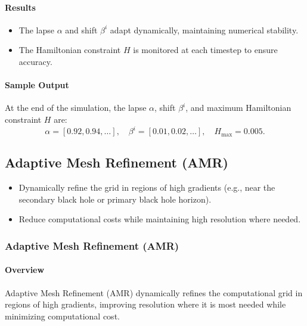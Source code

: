\documentclass[12pt]{article}
\begin{document}
\paragraph{Results}
\begin{itemize}
    \item The lapse $\alpha$ and shift $\beta^i$ adapt dynamically, maintaining numerical stability.
    \item The Hamiltonian constraint $H$ is monitored at each timestep to ensure accuracy.
\end{itemize}

\paragraph{Sample Output}
At the end of the simulation, the lapse $\alpha$, shift $\beta^i$, and maximum Hamiltonian constraint $H$ are:
\[
\alpha = [0.92, 0.94, \dots], \quad \beta^i = [0.01, 0.02, \dots], \quad H_{\text{max}} = 0.005.
\]


\subsection{Adaptive Mesh Refinement (AMR)}
\begin{itemize}
    \item Dynamically refine the grid in regions of high gradients (e.g., near the secondary black hole or primary black hole horizon).
    \item Reduce computational costs while maintaining high resolution where needed.
\end{itemize}

\subsubsection{Adaptive Mesh Refinement (AMR)}

\paragraph{Overview}
Adaptive Mesh Refinement (AMR) dynamically refines the computational grid in regions of high gradients, improving resolution where it is most needed while minimizing computational cost.
\end{document}
